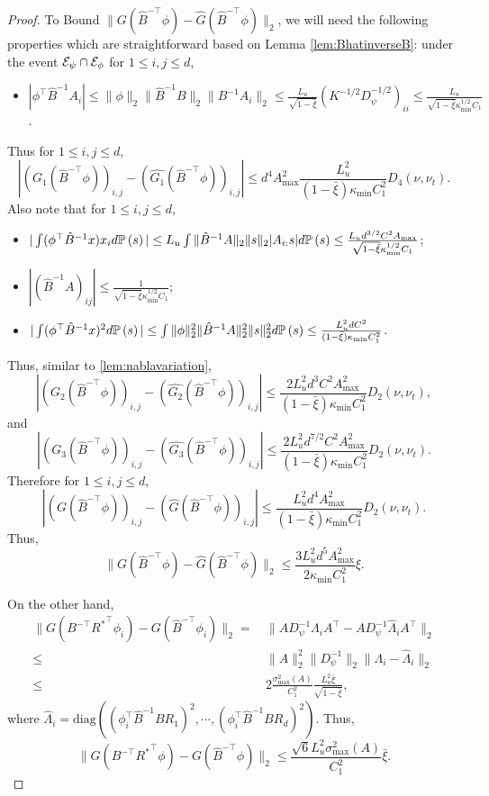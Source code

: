 \begin{proof}
To Bound $\|G(\hat{B}^{-\top}\phi) - \hat{G}(\hat{B}^{-\top}\phi)\|_2$, we will need the following properties which are straightforward based on Lemma \ref{lem:BhatinverseB}: 
under the event $ \mathcal{E}_{\psi}\cap \mathcal{E}_{\phi} $ for $1\le i, j\le d$,
\begin{itemize}
\item $|\phi^{\top}\hat{B}^{-1}A_i| \le \|\phi\|_2\|\hat{B}^{-1}B\|_2\|B^{-1}A_i\|_2\le
 \frac{L_u}{\sqrt{1-\bar{\xi}}} (K^{-1/2}D^{-1/2}_{\psi})_{ii} \le
 \frac{L_u}{\sqrt{1-\bar{\xi}}\kappa_{\min}^{1/2}C_1}$.
\end{itemize}
Thus for $1\le i, j\le d$,
\[
|(G_1(\hat{B}^{-\top}\phi))_{i,j} - (\hat{G_1}(\hat{B}^{-\top}\phi))_{i,j}| \le
d^4A^2_{\max}\frac{L_u^2}{(1-\bar{\xi})\kappa_{\min}C_1^2}D_4(\nu,\nu_t).
\]
Also note that for $1\le i, j\le d$,
\begin{itemize}
\item $|\int(\phi^{\top}\hat{B}^{-1}x)x_i d\mathbb{P}\left(s\right)| 
\le L_u\int \|\hat{B}^{-1}A\|_2\|s\|_2 |A_{i:}s| d\mathbb{P}\left(s\right)
\le \frac{L_ud^{3/2}C^2A_{\max}}{\sqrt{1-\bar{\xi}}\kappa_{\min}^{1/2}C_1}$; 
\item $|(\hat{B}^{-1}A)_{ij}| \le \frac{1}{\sqrt{1-\bar{\xi}}\kappa_{\min}^{1/2}C_1}$;
\item $|\int(\phi^{\top}\hat{B}^{-1}x)^2 d\mathbb{P}\left(s\right)|\le
 \int \|\phi\|_2^2 \|\hat{B}^{-1}A\|_2^2\|s\|_2^2 d\mathbb{P}\left(s\right) \le \frac{L_u^2dC^2}{(1-\bar{\xi})\kappa_{\min}C_1^2}$.
\end{itemize}
Thus, similar to \ref{lem:nablavariation},
\[
|(G_2(\hat{B}^{-\top}\phi))_{i,j} - (\hat{G_2}(\hat{B}^{-\top}\phi))_{i,j}| \le
\frac{2L_u^2d^3C^2A^2_{\max}}{(1-\bar{\xi})\kappa_{\min}C_1^2}D_2(\nu,\nu_t),
\]
and 
\[
|(G_3(\hat{B}^{-\top}\phi))_{i,j} - (\hat{G_3}(\hat{B}^{-\top}\phi))_{i,j}| \le
\frac{2L_u^2d^{7/2}C^2A^2_{\max}}{(1-\bar{\xi})\kappa_{\min}C_1^2}D_2(\nu,\nu_t).
\]
Therefore for $1\le i,j\le d$,
\[
\left|\left(G(\hat{B}^{-\top}\phi)\right)_{i,j} - \left(\hat{G}(\hat{B}^{-\top}\phi)\right)_{i,j}\right| 
\le
\frac{L_u^2d^4A^2_{\max}}{(1-\bar{\xi})\kappa_{\min}C_1^2}D_2(\nu,\nu_t). 
\]
Thus, 
\begin{equation}
\label{eq:fBhatfhatBhat}
 \|G(\hat{B}^{-\top}\phi) - \hat{G}(\hat{B}^{-\top}\phi)\|_2 \le 
\frac{3L_u^2d^5A^2_{\max}}{2\kappa_{\min}C_1^2}\xi.
\end{equation}

On the other hand, 
\begin{align*}
\|G(B^{-\top}{R^*}^{\top}\phi_i) - G(\hat{B}^{-\top}\phi_i)\|_2 
= & \, \|A D_{\psi}^{-1}\Lambda_iA^{\top}- A D_{\psi}^{-1}\hat{\Lambda}_iA^{\top}\|_2 \\
\le & \, \|A\|^2_2 \|D_{\psi}^{-1}\|_2 \|\Lambda_i - \hat{\Lambda}_i\|_2\\
\le & \, 2\frac{\sigma_{\max}^2(A)}{C_1^2}\frac{L_u^2\bar{\xi}}{\sqrt{1-\bar{\xi}}},
\end{align*}
where $\hat{\Lambda}_i = \text{diag}\left((\phi_i^{\top}\hat{B}^{-1}BR_1)^2, \cdots, (\phi_i^{\top}\hat{B}^{-1}BR_d)^2\right)$.
Thus,
\begin{equation}
\label{eq:fBfBhat}
\|G(B^{-\top}{R^*}^{\top}\phi) - G(\hat{B}^{-\top}\phi)\|_2 \le  \frac{\sqrt{6}L_u^2\sigma_{\max}^2(A)}{C_1^2}\bar{\xi}. 
\end{equation}


\end{proof}
